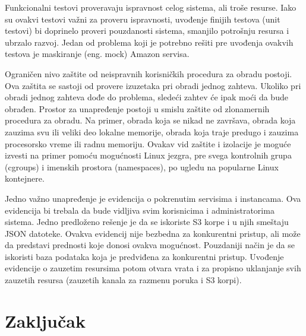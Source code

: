 \documentclass[a4paper]{article}
\begin{document}
Funkcionalni testovi proveravaju ispravnost celog sistema, ali troše resurse.
Iako su ovakvi testovi važni za proveru ispravnosti, uvođenje finijih testova
(unit testovi) bi doprinelo proveri pouzdanosti sistema, smanjilo potrošnju
resursa i ubrzalo razvoj. Jedan od problema koji je potrebno rešiti pre uvođenja
ovakvih testova je maskiranje (eng. mock) Amazon servisa.

Ograničen nivo zaštite od neispravnih korisničkih procedura za obradu postoji.
Ova zaštita se sastoji od provere izuzetaka pri obradi jednog zahteva. Ukoliko
pri obradi jednog zahteva dođe do problema, sledeći zahtev će ipak moći da bude
obrađen. Prostor za unapređenje postoji u smislu zaštite od zlonamernih
procedura za obradu. Na primer, obrada koja se nikad ne završava, obrada koja
zauzima svu ili veliki deo lokalne memorije, obrada koja traje predugo i zauzima
procesorsko vreme ili radnu memoriju. Ovakav vid zaštite i izolacije je moguće
izvesti na primer pomoću mogućnosti Linux jezgra, pre svega kontrolnih grupa
(cgroups) i imenskih prostora (namespaces), po ugledu na popularne Linux
kontejnere.

Jedno važno unapređenje je evidencija o pokrenutim servisima i instancama. Ova
evidencija bi trebala da bude vidljiva svim korisnicima i administratorima
sistema. Jedno predloženo rešenje je da se iskoriste S3 korpe i u njih smeštaju
JSON datoteke. Ovakva evidencij nije bezbedna za konkurentni pristup, ali može
da predstavi prednosti koje donosi ovakva mogućnost. Pouzdaniji način je da se
iskoristi baza podataka koja je predviđena za konkurentni pristup. Uvođenje
evidencije o zauzetim resursima potom otvara vrata i za propisno uklanjanje svih
zauzetih resursa (zauzetih kanala za razmenu poruka i S3 korpi).

\section{Zaključak}
\end{document}
